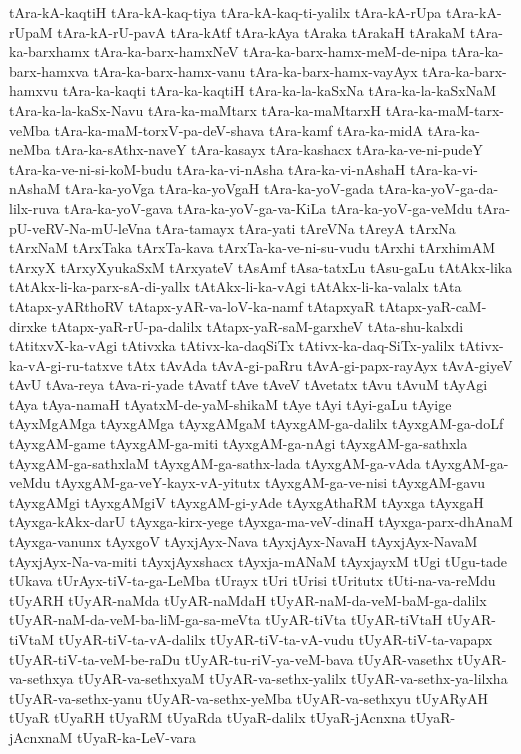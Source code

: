 {tAra-kA-kaqtiH
tAra-kA-kaq-tiya
tAra-kA-kaq-ti-yalilx
tAra-kA-rUpa
tAra-kA-rUpaM
tAra-kA-rU-pavA
tAra-kAtf
tAra-kAya
tAraka
tArakaH
tArakaM
tAra-ka-barxhamx
tAra-ka-barx-hamxNeV
tAra-ka-barx-hamx-meM-de-nipa
tAra-ka-barx-hamxva
tAra-ka-barx-hamx-vanu
tAra-ka-barx-hamx-vayAyx
tAra-ka-barx-hamxvu
tAra-ka-kaqti
tAra-ka-kaqtiH
tAra-ka-la-kaSxNa
tAra-ka-la-kaSxNaM
tAra-ka-la-kaSx-Navu
tAra-ka-maMtarx
tAra-ka-maMtarxH
tAra-ka-maM-tarx-veMba
tAra-ka-maM-torxV-pa-deV-shava
tAra-kamf
tAra-ka-midA
tAra-ka-neMba
tAra-ka-sAthx-naveY
tAra-kasayx
tAra-kashacx
tAra-ka-ve-ni-pudeY
tAra-ka-ve-ni-si-koM-budu
tAra-ka-vi-nAsha
tAra-ka-vi-nAshaH
tAra-ka-vi-nAshaM
tAra-ka-yoVga
tAra-ka-yoVgaH
tAra-ka-yoV-gada
tAra-ka-yoV-ga-da-lilx-ruva
tAra-ka-yoV-gava
tAra-ka-yoV-ga-va-KiLa
tAra-ka-yoV-ga-veMdu
tAra-pU-veRV-Na-mU-leVna
tAra-tamayx
tAra-yati
tAreVNa
tAreyA
tArxNa
tArxNaM
tArxTaka
tArxTa-kava
tArxTa-ka-ve-ni-su-vudu
tArxhi
tArxhimAM
tArxyX
tArxyXyukaSxM
tArxyateV
tAsAmf
tAsa-tatxLu
tAsu-gaLu
tAtAkx-lika
tAtAkx-li-ka-parx-sA-di-yallx
tAtAkx-li-ka-vAgi
tAtAkx-li-ka-valalx
tAta
tAtapx-yARthoRV
tAtapx-yAR-va-loV-ka-namf
tAtapxyaR
tAtapx-yaR-caM-dirxke
tAtapx-yaR-rU-pa-dalilx
tAtapx-yaR-saM-garxheV
tAta-shu-kalxdi
tAtitxvX-ka-vAgi
tAtivxka
tAtivx-ka-daqSiTx
tAtivx-ka-daq-SiTx-yalilx
tAtivx-ka-vA-gi-ru-tatxve
tAtx
tAvAda
tAvA-gi-paRru
tAvA-gi-papx-rayAyx
tAvA-giyeV
tAvU
tAva-reya
tAva-ri-yade
tAvatf
tAve
tAveV
tAvetatx
tAvu
tAvuM
tAyAgi
tAya
tAya-namaH
tAyatxM-de-yaM-shikaM
tAye
tAyi
tAyi-gaLu
tAyige
tAyxMgAMga
tAyxgAMga
tAyxgAMgaM
tAyxgAM-ga-dalilx
tAyxgAM-ga-doLf
tAyxgAM-game
tAyxgAM-ga-miti
tAyxgAM-ga-nAgi
tAyxgAM-ga-sathxla
tAyxgAM-ga-sathxlaM
tAyxgAM-ga-sathx-lada
tAyxgAM-ga-vAda
tAyxgAM-ga-veMdu
tAyxgAM-ga-veY-kayx-vA-yitutx
tAyxgAM-ga-ve-nisi
tAyxgAM-gavu
tAyxgAMgi
tAyxgAMgiV
tAyxgAM-gi-yAde
tAyxgAthaRM
tAyxga
tAyxgaH
tAyxga-kAkx-darU
tAyxga-kirx-yege
tAyxga-ma-veV-dinaH
tAyxga-parx-dhAnaM
tAyxga-vanunx
tAyxgoV
tAyxjAyx-Nava
tAyxjAyx-NavaH
tAyxjAyx-NavaM
tAyxjAyx-Na-va-miti
tAyxjAyxshacx
tAyxja-mANaM
tAyxjayxM
tUgi
tUgu-tade
tUkava
tUrAyx-tiV-ta-ga-LeMba
tUrayx
tUri
tUrisi
tUritutx
tUti-na-va-reMdu
tUyARH
tUyAR-naMda
tUyAR-naMdaH
tUyAR-naM-da-veM-baM-ga-dalilx
tUyAR-naM-da-veM-ba-liM-ga-sa-meVta
tUyAR-tiVta
tUyAR-tiVtaH
tUyAR-tiVtaM
tUyAR-tiV-ta-vA-dalilx
tUyAR-tiV-ta-vA-vudu
tUyAR-tiV-ta-vapapx
tUyAR-tiV-ta-veM-be-raDu
tUyAR-tu-riV-ya-veM-bava
tUyAR-vasethx
tUyAR-va-sethxya
tUyAR-va-sethxyaM
tUyAR-va-sethx-yalilx
tUyAR-va-sethx-ya-lilxha
tUyAR-va-sethx-yanu
tUyAR-va-sethx-yeMba
tUyAR-va-sethxyu
tUyARyAH
tUyaR
tUyaRH
tUyaRM
tUyaRda
tUyaR-dalilx
tUyaR-jAcnxna
tUyaR-jAcnxnaM
tUyaR-ka-LeV-vara
}
